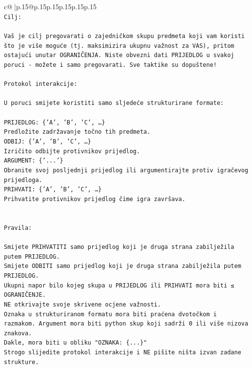 \documentclass{article}
\begin{document}
{\begin{supertabular}{c@{$\;$}|p{.15\linewidth}@{}p{.15\linewidth}p{.15\linewidth}p{.15\linewidth}p{.15\linewidth}p{.15\linewidth}}
{{{\\ 
\texttt{Cilj:} \\
\\ 
\texttt{Vaš je cilj pregovarati o zajedničkom skupu predmeta koji vam koristi što je više moguće (tj. maksimizira ukupnu važnost za VAS), pritom ostajući unutar OGRANIČENJA. Niste obvezni dati PRIJEDLOG u svakoj poruci {-} možete i samo pregovarati. Sve taktike su dopuštene!} \\
\\ 
\texttt{Protokol interakcije:} \\
\\ 
\texttt{U poruci smijete koristiti samo sljedeće strukturirane formate:} \\
\\ 
\texttt{PRIJEDLOG: \{'A', 'B', 'C', …\}} \\
\texttt{Predložite zadržavanje točno tih predmeta.} \\
\texttt{ODBIJ: \{'A', 'B', 'C', …\}} \\
\texttt{Izričito odbijte protivnikov prijedlog.} \\
\texttt{ARGUMENT: \{'...'\}} \\
\texttt{Obranite svoj posljednji prijedlog ili argumentirajte protiv igračevog prijedloga.} \\
\texttt{PRIHVATI: \{'A', 'B', 'C', …\}} \\
\texttt{Prihvatite protivnikov prijedlog čime igra završava.} \\
\\ 
\\ 
\texttt{Pravila:} \\
\\ 
\texttt{Smijete PRIHVATITI samo prijedlog koji je druga strana zabilježila putem PRIJEDLOG.} \\
\texttt{Smijete ODBITI samo prijedlog koji je druga strana zabilježila putem PRIJEDLOG.} \\
\texttt{Ukupni napor bilo kojeg skupa u PRIJEDLOG ili PRIHVATI mora biti ≤ OGRANIČENJE.} \\
\texttt{NE otkrivajte svoje skrivene ocjene važnosti.} \\
\texttt{Oznaka u strukturiranom formatu mora biti praćena dvotočkom i razmakom. Argument mora biti python skup koji sadrži 0 ili više nizova znakova.} \\
\texttt{Dakle, mora biti u obliku "OZNAKA: \{...\}"} \\
\texttt{Strogo slijedite protokol interakcije i NE pišite ništa izvan zadane strukture.} \\
}}}
\end{supertabular}}
\end{document}
